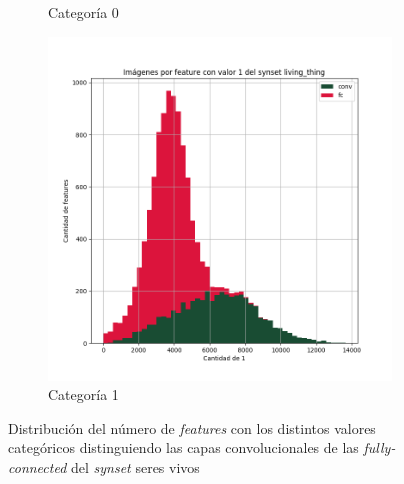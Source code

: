 \documentclass[12,twoside]{TFG-GM}
\theoremstyle{definition}
\theoremstyle{remark}
\begin{document}
\begin{figure}[ht]
\begin{subfigure}[b]{0.3\textwidth}
		\caption{Categoría 0}
	\end{subfigure}
	\begin{subfigure}[b]{0.3\textwidth}
		\includegraphics[width=\textwidth]  {Images/plots/25/synsets/Images_per_feature_of_1_category_living_thingall_layers.png}
		\caption{Categoría 1}
	\end{subfigure}       
	\caption{Distribución del número de \textit{features} con los distintos valores categóricos distinguiendo las capas convolucionales de las \textit{fully-connected} del \textit{synset} seres vivos \label{fig:imagesperfeatureliving}}
\end{figure}
\end{document}
